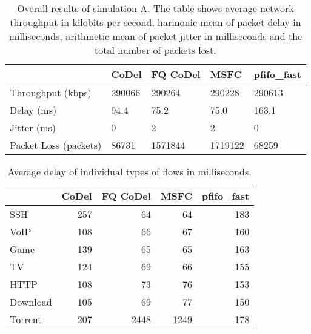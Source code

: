 \begin{table}[]
	\centering
	\caption{Overall results of simulation A. The table shows average network throughput in kilobits per second, harmonic mean of packet delay in milliseconds, arithmetic mean of packet jitter in milliseconds and the total number of packets lost.}
	\label{tab:results_A}
	\begin{tabular}{@{}lllll@{}}
		\toprule
								& CoDel & FQ CoDel & MSFC & pfifo\_fast  \\ \midrule
		Throughput (kbps)       & 290066    & 290264 & 290228   & 290613 \\
		Delay (ms)              & 94.4      & 75.2   & 75.0     & 163.1    \\
		Jitter (ms)             & 0         & 2      & 2        & 0      \\
		Packet Loss (packets)   & 86731     & 1571844& 1719122  & 68259  \\ \bottomrule
	\end{tabular}
\end{table}


\begin{table}
	\caption{Average delay of individual types of flows in milliseconds.}
	\label{tab:delay_A}
	\centering
	
	\begin{tabular}{@{}l|rrrr@{}}
		\toprule
						& CoDel & FQ CoDel & MSFC & pfifo\_fast  \\ \midrule
		SSH             &     257       &     64        &     64        &     183       \\
		VoIP            &     108       &     66        &     67        &     160       \\
		Game            &     139       &     65        &     65        &     163       \\
		TV              &     124       &     69        &     66        &     155       \\
		HTTP            &     108       &     73        &     76        &     153       \\
		Download        &     105       &     69        &     77        &     150       \\
		Torrent         &     207       &     2448      &     1249      &     178       \\ \bottomrule
	\end{tabular}
\end{table}

